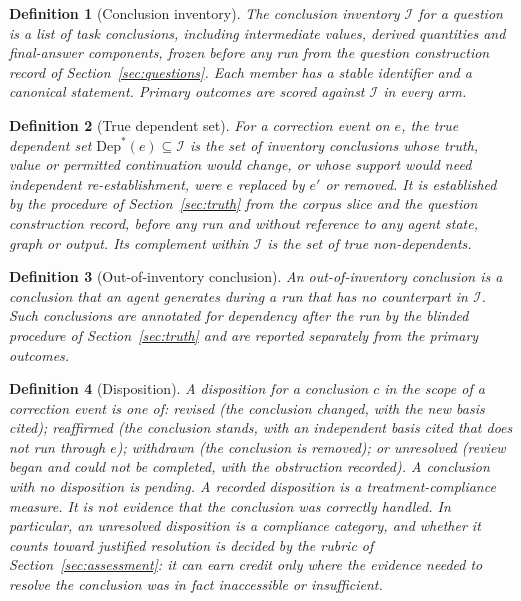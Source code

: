 \documentclass[11pt]{article}
\newtheorem{definition}{Definition}
\newcommand{\Inv}{\mathcal{I}}
\newcommand{\Dep}{\mathrm{Dep}}
\begin{document}
\begin{definition}[Conclusion inventory]
The conclusion inventory $\Inv$ for a question is a list of task conclusions, including intermediate values, derived quantities and final-answer components, frozen before any run from the question construction record of Section~\ref{sec:questions}. Each member has a stable identifier and a canonical statement. Primary outcomes are scored against $\Inv$ in every arm.
\end{definition}

\begin{definition}[True dependent set]
For a correction event on $e$, the true dependent set $\Dep^{*}(e)\subseteq\Inv$ is the set of inventory conclusions whose truth, value or permitted continuation would change, or whose support would need independent re-establishment, were $e$ replaced by $e'$ or removed. It is established by the procedure of Section~\ref{sec:truth} from the corpus slice and the question construction record, before any run and without reference to any agent state, graph or output. Its complement within $\Inv$ is the set of true non-dependents.
\end{definition}

\begin{definition}[Out-of-inventory conclusion]
An out-of-inventory conclusion is a conclusion that an agent generates during a run that has no counterpart in $\Inv$. Such conclusions are annotated for dependency after the run by the blinded procedure of Section~\ref{sec:truth} and are reported separately from the primary outcomes.
\end{definition}

\begin{definition}[Disposition]
A disposition for a conclusion $c$ in the scope of a correction event is one of: \emph{revised} (the conclusion changed, with the new basis cited); \emph{reaffirmed} (the conclusion stands, with an independent basis cited that does not run through $e$); \emph{withdrawn} (the conclusion is removed); or \emph{unresolved} (review began and could not be completed, with the obstruction recorded). A conclusion with no disposition is \emph{pending}. A recorded disposition is a treatment-compliance measure. It is not evidence that the conclusion was correctly handled. In particular, an unresolved disposition is a compliance category, and whether it counts toward justified resolution is decided by the rubric of Section~\ref{sec:assessment}: it can earn credit only where the evidence needed to resolve the conclusion was in fact inaccessible or insufficient.
\end{definition}
\end{document}
